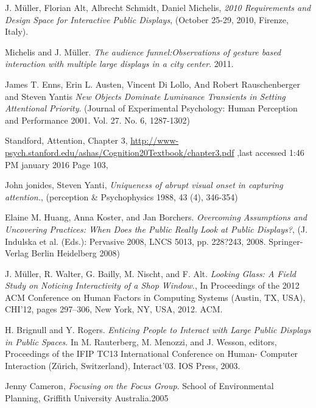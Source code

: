 \begin{thebibliography}{9}


J. Müller, Florian Alt, Albrecht Schmidt, Daniel Michelis, 
 \emph{2010 Requirements and Design Space for Interactive Public Displays},
 (October 25-29, 2010, Firenze, Italy). 
 
Michelis and J. Müller.
\emph{The audience funnel:Observations of gesture based interaction with multiple large displays in a city center}.
 2011.

James T. Enns, Erin L. Austen, Vincent Di Lollo, And Robert Rauschenberger and Steven Yantis 
\emph{New Objects Dominate Luminance Transients in Setting Attentional Priority}.
 (Journal of Experimental Psychology: Human Perception and Performance 2001. Vol. 27. No. 6, 1287-1302) 

Standford, Attention, Chapter 3,
\url{http://www-psych.stanford.edu/ashas/Cognition20Textbook/chapter3.pdf}
,last accessed 1:46 PM january 2016 Page 103, 
 
John jonides, Steven Yanti, 
\emph{Uniqueness of abrupt visual onset in capturing attention.},
(perception \& Psychophysics 1988, 43 (4), 346-354) 

Elaine M. Huang, Anna Koster, and Jan Borchers. 
\emph{Overcoming Assumptions and Uncovering Practices: When Does the Public Really Look at Public Displays?},
(J. Indulska et al. (Eds.): Pervasive 2008, LNCS 5013, pp. 228?243, 2008. Springer-Verlag Berlin Heidelberg 2008) 

J. Müller, R. Walter, G. Bailly, M. Nischt, and F. Alt. 
\emph{Looking Glass: A Field Study on Noticing Interactivity of a Shop Window.},
In Proceedings of the 2012 ACM Conference on Human Factors in Computing Systems (Austin, TX, USA), CHI’12, pages 297–306, New York, NY, USA, 2012. ACM.

H. Brignull and Y. Rogers. 
\emph{Enticing People to Interact with Large Public Displays in Public Spaces}. 
In M. Rauterberg, M. Menozzi, and J. Wesson, editors, Proceedings of the IFIP TC13 International Conference on Human- Computer Interaction (Zürich, Switzerland), Interact’03. IOS Press, 2003.

Jenny Cameron,
\emph{Focusing on the Focus Group}. 
School of Environmental Planning, Griffith University Australia.2005



\end{thebibliography}
